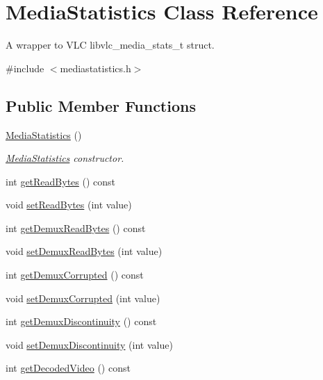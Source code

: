 \hypertarget{classMediaStatistics}{\section{Media\-Statistics Class Reference}
\label{classMediaStatistics}
}


A wrapper to V\-L\-C libvlc\-\_\-media\-\_\-stats\-\_\-t struct.  




{\ttfamily \#include $<$mediastatistics.\-h$>$}

\subsection*{Public Member Functions}
\begin{DoxyCompactItemize}
\item 
\hyperlink{classMediaStatistics_a5b768a2e4c481a3e630ea88f1d7e6540}{Media\-Statistics} ()
\begin{DoxyCompactList}\small\item\em \hyperlink{classMediaStatistics}{Media\-Statistics} constructor. \end{DoxyCompactList}\item 
int \hyperlink{classMediaStatistics_a93b33f4ac072547f33b6a5be0d47f1d2}{get\-Read\-Bytes} () const 
\item 
void \hyperlink{classMediaStatistics_a729d2733cd49ad96ab595bb5eb38fe87}{set\-Read\-Bytes} (int value)
\item 
int \hyperlink{classMediaStatistics_ac48baa2b782e0dbcadd5d69914f9e80c}{get\-Demux\-Read\-Bytes} () const 
\item 
void \hyperlink{classMediaStatistics_afecbd2e8ebc147b344a9dc18dc6af431}{set\-Demux\-Read\-Bytes} (int value)
\item 
int \hyperlink{classMediaStatistics_aaa080505dbe504d5a4d696f4cbaf989d}{get\-Demux\-Corrupted} () const 
\item 
void \hyperlink{classMediaStatistics_a6d9b5760c321c9e189c780ad64cda8f8}{set\-Demux\-Corrupted} (int value)
\item 
int \hyperlink{classMediaStatistics_ad3c91e75dd165e0ca308dc40990ecc87}{get\-Demux\-Discontinuity} () const 
\item 
void \hyperlink{classMediaStatistics_a05b13c332cd4ed139392e528b52ac89c}{set\-Demux\-Discontinuity} (int value)
\item 
int \hyperlink{classMediaStatistics_a5265392ca4db34bf23cf298e8fd506af}{get\-Decoded\-Video} () const 

\end{DoxyCompactItemize}
